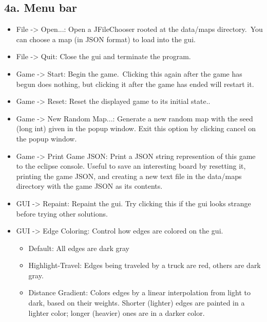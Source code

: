 \documentclass[11pt]{article}
\begin{document}
\subsection{4a. Menu bar}
\begin{itemize}
\item File -> Open...: Open a JFileChooser rooted at the data/maps directory.\ You can choose a map (in JSON format) to load into the gui.
\item File -> Quit:  Close the gui and terminate the program.
\item Game -> Start: Begin the game.\ Clicking this again after the game has begun does nothing, but clicking it after the game has ended will restart it.
\item Game -> Reset: Reset the displayed game to its initial state..
\item Game -> New Random Map...: Generate a new random map with the seed (long int) given in the popup window. Exit this option by clicking cancel on the popup window.
\item Game -> Print Game JSON: Print a JSON string represention of this game to the eclipse console. Useful to save an interesting board by resetting it, printing the game JSON, and creating a new text file in the data/maps directory with the game JSON as its contents.
\item GUI -> Repaint: Repaint the gui. Try clicking this if the gui looks strange before trying other solutions.
\item GUI -> Edge Coloring: Control how edges are colored on the gui.
\begin{itemize}
\item Default: All edges are dark gray
\item Highlight-Travel: Edges being traveled by a truck are red, others are dark gray.
\item Distance Gradient: Colors edges by a linear interpolation from light to dark, based on their weights. Shorter (lighter) edges are painted in a lighter color; longer (heavier) ones are in a  darker color.
\end{itemize}
\end{itemize}
\end{document}
